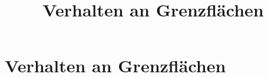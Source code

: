

\title[TET: Verhalten an Grenzflächen]{Verhalten an Grenzflächen}


% 
% 

\maketitle

% 
% 
\section{Verhalten an Grenzflächen}

